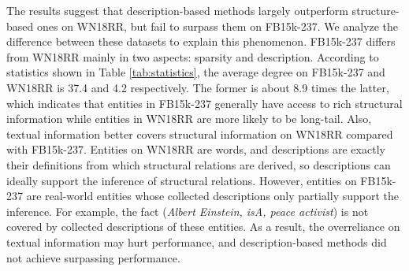 \documentclass{article}
\begin{document}
The results suggest that description-based methods largely outperform structure-based ones on WN18RR, but fail to surpass them on FB15k-237.  
We analyze the difference between these datasets to explain this phenomenon.
FB15k-237 differs from WN18RR mainly in two aspects: sparsity and description. 
According to statistics shown in Table \ref{tab:statistics}, 
the average degree on FB15k-237 and WN18RR is 37.4 and 4.2 respectively. 
The former is about 8.9 times the latter, which indicates that entities in FB15k-237 generally have access to rich structural information while entities in WN18RR are more likely to be long-tail. 
Also, textual information better covers structural information on WN18RR compared with FB15k-237. 
Entities on WN18RR are words, and descriptions are exactly their definitions from which structural relations are derived, so descriptions can ideally support the inference of structural relations.
However, entities on FB15k-237 are real-world entities whose collected descriptions only partially support the inference. 
For example, the fact (\textit{Albert Einstein, isA, peace activist}) is not covered by collected descriptions of these entities. 
As a result, the overreliance on textual information may hurt performance, and description-based methods did not achieve surpassing performance. 


\begin{table}[htbp]
    \small
    \centering
{}
    \caption{Accuracy of triple classification on FB13 and UMLS.
    Results of existing baselines on FB13 and UMLS are taken from ~\protect\cite{yao2019kgbert} and ~\protect\cite{yaser2021triple} respectively. }
    \label{tab:main_exp_cls}
\end{table}
\end{document}
